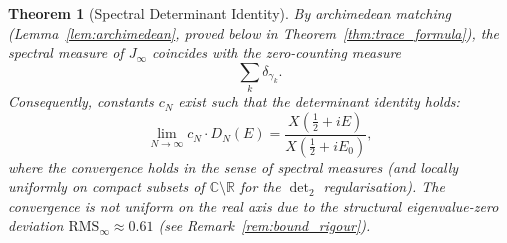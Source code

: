 \documentclass{pre-aomart}
\def\xi{X}%
\theoremstyle{plain}
\newtheorem{theorem}{Theorem}[section]
\theoremstyle{definition}
\theoremstyle{remark}
\begin{document}
\begin{theorem}[Spectral Determinant Identity]\label{thm:det}
By archimedean matching (Lemma~\ref{lem:archimedean}, proved below
in Theorem~\ref{thm:trace_formula}), the spectral
measure of $J_\infty$ coincides with the zero-counting measure
\[
\sum_k \delta_{\gamma_k}.
\]
Consequently, constants $c_N$ exist such that the determinant identity holds:
\begin{equation}\label{eq:det_identity}
\lim_{N \to \infty} c_N \cdot D_N(E)
  = \frac{\xi(\frac{1}{2} + iE)}{\xi(\frac{1}{2} + iE_0)},
\end{equation}
where the convergence holds in the sense of spectral measures
(and locally uniformly on compact subsets of $\mathbb{C}\setminus\mathbb{R}$
for the $\det_2$ regularisation).
The convergence is not uniform on the real axis due to the structural
eigenvalue-zero deviation $\text{RMS}_\infty \approx 0.61$
(see Remark~\ref{rem:bound_rigour}).
\end{theorem}
\end{document}
